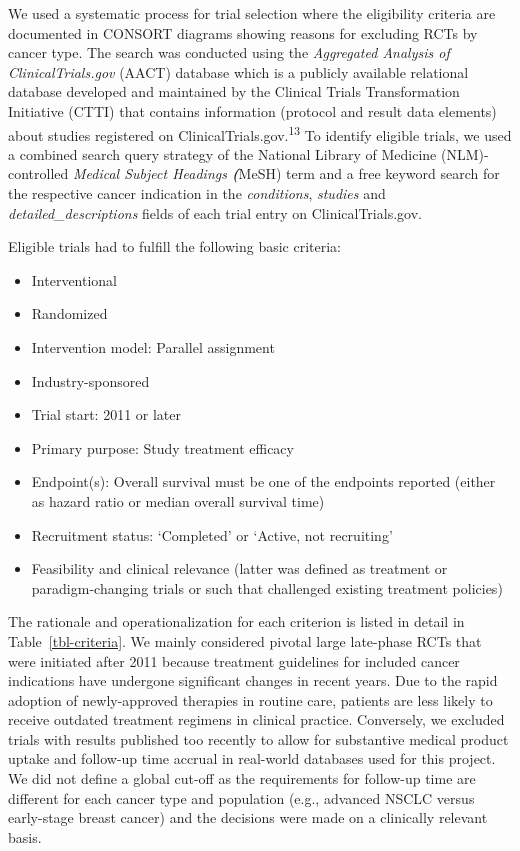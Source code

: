 \documentclass[
  letterpaper,
  DIV=11,
  numbers=noendperiod]{scrartcl}
\begin{document}
We used a systematic process for trial selection where the eligibility
criteria are documented in CONSORT diagrams showing reasons for
excluding RCTs by cancer type. The search was conducted using the
\emph{Aggregated Analysis of ClinicalTrials.gov} (AACT) database which
is a publicly available relational database developed and maintained by
the Clinical Trials Transformation Initiative (CTTI) that contains
information (protocol and result data elements) about studies registered
on ClinicalTrials.gov.\textsuperscript{13} To identify eligible trials,
we used a combined search query strategy of the National Library of
Medicine (NLM)-controlled \emph{Medical Subject Headings
\textbf{(}}MeSH) term and a free keyword search for the respective
cancer indication in the \emph{conditions}, \emph{studies} and
\emph{detailed\_descriptions} fields of each trial entry on
ClinicalTrials.gov.

Eligible trials had to fulfill the following basic criteria:

\begin{itemize}
\item
  Interventional
\item
  Randomized
\item
  Intervention model: Parallel assignment
\item
  Industry-sponsored
\item
  Trial start: 2011 or later
\item
  Primary purpose: Study treatment efficacy
\item
  Endpoint(s): Overall survival must be one of the endpoints reported
  (either as hazard ratio or median overall survival time)
\item
  Recruitment status: `Completed' or `Active, not recruiting'
\item
  Feasibility and clinical relevance (latter was defined as treatment or
  paradigm-changing trials or such that challenged existing treatment
  policies)
\end{itemize}

The rationale and operationalization for each criterion is listed in
detail in Table~\ref{tbl-criteria}. We mainly considered pivotal large
late-phase RCTs that were initiated after 2011 because treatment
guidelines for included cancer indications have undergone significant
changes in recent years. Due to the rapid adoption of newly-approved
therapies in routine care, patients are less likely to receive outdated
treatment regimens in clinical practice. Conversely, we excluded trials
with results published too recently to allow for substantive medical
product uptake and follow-up time accrual in real-world databases used
for this project. We did not define a global cut-off as the requirements
for follow-up time are different for each cancer type and population
(e.g., advanced NSCLC versus early-stage breast cancer) and the
decisions were made on a clinically relevant basis.
\end{document}
